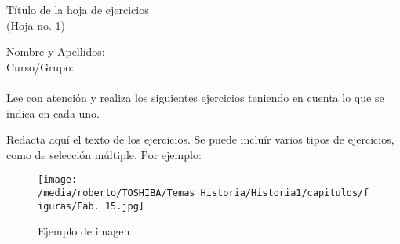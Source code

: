 %
% 
% 
%

\usepackage{graphicx}

%
%
%
\begin{center}
\Large{
Título de la hoja de ejercicios %
} \\
\vspace*{0.5cm}
\normalsize
(Hoja no. 1) %
\\
\vspace{1.10cm}
	\begin{flushleft}
	Nombre y Apellidos: \\  %
	\vspace*{0.50cm}		%
	Curso/Grupo: \\ 		%
	\hrulefill \\			
	\vspace*{0.75cm}
%
	Lee con atención y realiza los siguientes ejercicios teniendo en cuenta lo que se indica en cada uno. \\
	\vspace*{0.75cm}		
 	\end{flushleft}
\end{center}
%
%  
\begin{ejercicio}[] 
Redacta aquí el texto de los ejercicios. Se puede incluír varios tipos de ejercicios, como de selección múltiple. 
Por ejemplo:
\end{ejercicio}
%
\begin{figure}[htp]
\centering
\texttt{[image: /media/roberto/TOSHIBA/Temas\_Historia/Historia1/capitulos/figuras/Fab. 15.jpg]}
\caption{Ejemplo de imagen}
\label{Imagen 1}
\end{figure}
%
%

